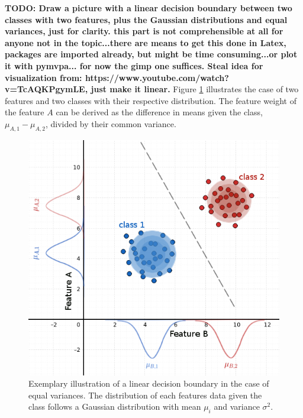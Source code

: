 \documentclass[a4paper, 12pt]{scrreprt}
\begin{document}
{\textbf{TODO: Draw a picture with a linear decision boundary between two classes with two features, plus the Gaussian distributions and equal variances, just for clarity. this part is not comprehensible at all for anyone not in the topic...there are means to get this done in Latex, packages are imported already, but might be time consuming...or plot it with pymvpa...  for now the gimp one suffices.
Steal idea for visualization from: \newline https://www.youtube.com/watch?v=TcAQKPgymLE, just make it linear.}
\newline
Figure \ref{GNB} illustrates the case of two features and two classes with their respective distribution. The feature weight of the feature $A$ can be derived as the difference in means given the class, $\mu_{A, 1} - \mu_{A, 2}$, divided by their common variance.
\begin{figure}[H]
	\includegraphics[scale=0.5]{img/GNB.png}
	\caption[A linear decision boundery for a linear Gaussian Naive Bayes classifier]{\small{Exemplary illustration of a linear decision boundary in the case of equal variances. The distribution of each features data given the class follows a Gaussian distribution with mean $\mu_i$ and variance $\sigma^2$.}}
	\label{GNB}
\end{figure}

}
\end{document}
